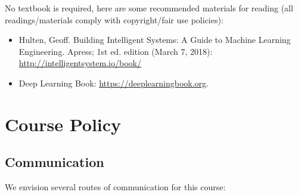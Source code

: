 \documentclass[11pt]{article}
\begin{document}
No textbook is required, here are some recommended materials for reading (all readings/materials comply with copyright/fair use policies):
\begin{itemize}
\item Hulten, Geoff. Building Intelligent Systems: A Guide to Machine Learning Engineering. Apress; 1st ed. edition (March 7, 2018): \url{http://intelligentsystem.io/book/}
\item Deep Learning Book: \url{https://deeplearningbook.org}.
\end{itemize}

\newpage

\section*{Course Policy}

\subsection*{Communication}
We envision several routes of communication for this course:
\end{document}
